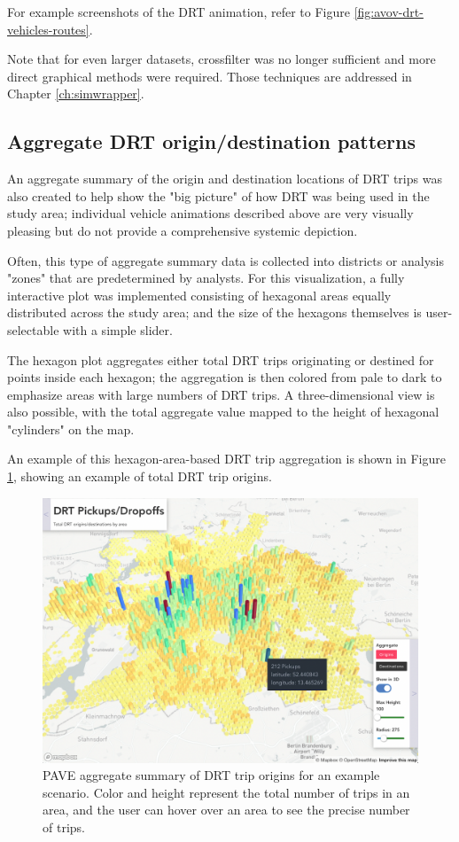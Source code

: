 For example screenshots of the DRT animation, refer to Figure \ref{fig:avov-drt-vehicles-routes}.

Note that for even larger datasets, crossfilter was no longer sufficient and more direct graphical methods were required. Those techniques are addressed in Chapter \ref{ch:simwrapper}.

\subsection{Aggregate DRT origin/destination patterns}
\label{pave-od-hexagons}

An aggregate summary of the origin and destination locations of DRT trips was also created to help show the "big picture" of how DRT was being used in the study area; individual vehicle animations described above are very visually pleasing but do not provide a comprehensive systemic depiction.

Often, this type of aggregate summary data is collected into districts or analysis "zones" that are predetermined by analysts. For this visualization, a fully interactive plot was implemented consisting of hexagonal areas equally distributed across the study area; and the size of the hexagons themselves is user-selectable with a simple slider.

The hexagon plot aggregates either total DRT trips originating or destined for points inside each hexagon; the aggregation is then colored from pale to dark to emphasize areas with large numbers of DRT trips. A three-dimensional view is also possible, with the total aggregate value mapped to the height of hexagonal "cylinders" on the map.

An example of this hexagon-area-based DRT trip aggregation is shown in Figure \ref{fig:pave-xy-origins}, showing an example of total DRT trip origins.

\begin{figure}[ht]
\centering
  \includegraphics[width=0.95\linewidth]{chapters/23-pave/images/fig-xy-origins.png}
\caption{PAVE aggregate summary of DRT trip origins for an example scenario. Color and height represent the total number of trips in an area, and the user can hover over an area to see the precise number of trips.}
\label{fig:pave-xy-origins}
\end{figure}

